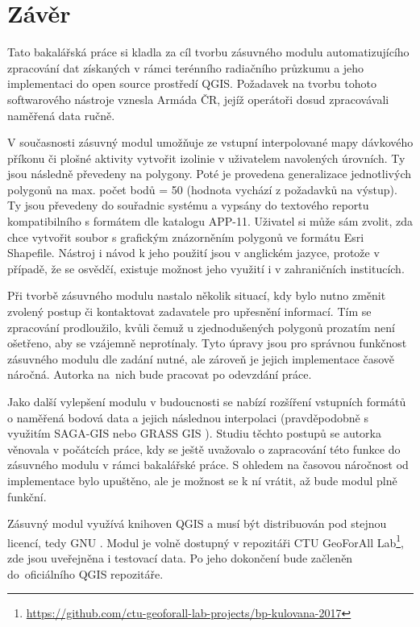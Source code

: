 \chapter{Závěr}
\label{5-zaver}


Tato bakalářská práce si kladla za cíl tvorbu zásuvného modulu
automatizujícího zpracování dat získaných v rámci terénního radiačního
průzkumu a jeho implementaci do open source prostředí QGIS. Požadavek
na tvorbu tohoto softwarového nástroje vznesla Armáda ČR, jejíž
operátoři dosud zpracovávali naměřená data ručně. 

V současnosti zásuvný modul umožňuje ze vstupní interpolované mapy
dávkového příkonu či plošné aktivity vytvořit izolinie v uživatelem
navolených úrovních. Ty jsou následně převedeny na polygony. Poté je
provedena generalizace jednotlivých polygonů na max. počet bodů = 50
(hodnota vychází z požadavků na výstup). Ty jsou převedeny do
souřadnic systému  a vypsány do textového reportu
kompatibilního s formátem dle katalogu APP-11. Uživatel si může sám
zvolit, zda chce vytvořit soubor s grafickým znázorněním polygonů ve
formátu Esri Shapefile. Nástroj i návod k jeho použití jsou v
anglickém jazyce, protože v případě, že se osvědčí, existuje možnost
jeho využití i v zahraničních institucích.

Při tvorbě zásuvného modulu nastalo několik situací, kdy bylo nutno
změnit zvolený postup či kontaktovat zadavatele pro upřesnění
informací. Tím se zpracování prodloužilo, kvůli čemuž u zjednodušených
polygonů prozatím není ošetřeno, aby se vzájemně neprotínaly. Tyto
úpravy jsou pro správnou funkčnost zásuvného modulu dle zadání nutné,
ale zároveň je jejich implementace časově náročná. Autorka na~nich
bude pracovat po odevzdání práce.

Jako další vylepšení modulu v budoucnosti se nabízí rozšíření
vstupních formátů o naměřená bodová data a jejich následnou
interpolaci (pravděpodobně s využitím SAGA-GIS nebo GRASS GIS
). Studiu těchto postupů se autorka věnovala v počátcích
práce, kdy se ještě uvažovalo o zapracování této funkce do zásuvného
modulu v rámci bakalářské práce. S ohledem na časovou náročnost od
implementace bylo upuštěno, ale je možnost se k ní vrátit, až bude
modul plně funkční.

Zásuvný modul využívá knihoven QGIS a musí být distribuován pod
stejnou licencí, tedy GNU . Modul je volně dostupný v
repozitáři CTU GeoForAll
Lab\footnote{\url{https://github.com/ctu-geoforall-lab-projects/bp-kulovana-2017}},
zde jsou uveřejněna i testovací data. Po jeho dokončení bude začleněn
do~oficiálního QGIS repozitáře.
